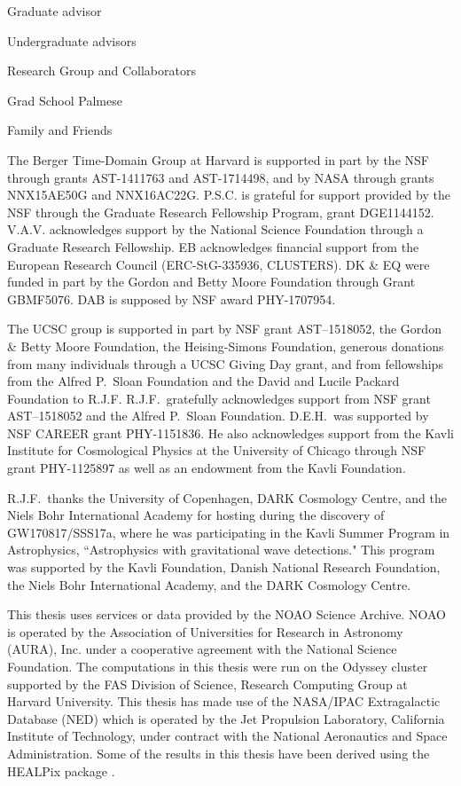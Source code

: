 Graduate advisor

Undergraduate advisors

Research Group and Collaborators

Grad School Palmese

Family and Friends

The Berger Time-Domain Group at Harvard is supported in part by the NSF through grants AST-1411763 and AST-1714498, and by NASA through grants NNX15AE50G and NNX16AC22G. P.S.C. is grateful for support provided by the NSF through the Graduate Research Fellowship Program, grant DGE1144152. V.A.V. acknowledges support by the National Science Foundation through a Graduate Research Fellowship. EB acknowledges financial support from the European Research Council (ERC-StG-335936, CLUSTERS). DK \& EQ were funded in part by the Gordon and Betty Moore Foundation through Grant GBMF5076. DAB is supposed by NSF award PHY-1707954.

The UCSC group is supported in part by NSF grant AST--1518052, the Gordon \& Betty Moore Foundation, the Heising-Simons Foundation, generous donations from many individuals through a UCSC Giving Day grant, and from fellowships from the Alfred P.\ Sloan Foundation and the David and Lucile Packard Foundation to R.J.F. R.J.F.\ gratefully acknowledges support from NSF grant AST--1518052 and the Alfred P.\ Sloan Foundation. D.E.H.\ was supported by NSF CAREER grant PHY-1151836. He also acknowledges support from the Kavli Institute for Cosmological Physics at the University of Chicago through NSF grant PHY-1125897 as well as an endowment from the Kavli Foundation.

R.J.F.\ thanks the University of Copenhagen, DARK Cosmology Centre, and the Niels Bohr International Academy for hosting during the discovery of GW170817/SSS17a, where he was participating in the Kavli Summer Program in Astrophysics, ``Astrophysics with gravitational wave detections."  This program was supported by the Kavli Foundation, Danish National Research Foundation, the Niels Bohr International Academy, and the DARK Cosmology Centre.

This thesis uses services or data provided by the NOAO Science Archive. NOAO is operated by the Association of Universities for Research in Astronomy (AURA), Inc. under a cooperative agreement with the National Science Foundation. The computations in this thesis were run on the Odyssey cluster supported by the FAS Division of Science, Research Computing Group at Harvard University. This thesis has made use of the NASA/IPAC Extragalactic Database (NED) which is operated by the Jet Propulsion Laboratory, California Institute of Technology, under contract with the National Aeronautics and Space Administration. Some of the results in this thesis have been derived using the HEALPix package \citep{Gorski+05}.

